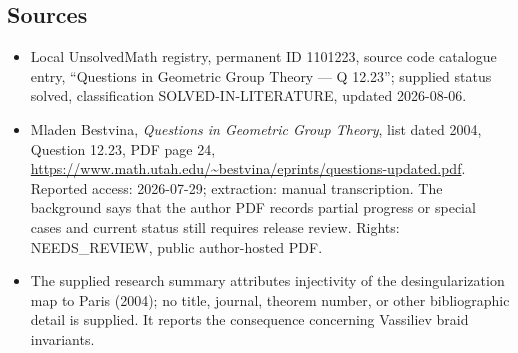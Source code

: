\documentclass[11pt]{article}
\begin{document}
\subsection{Sources}
\begin{itemize}
\item Local UnsolvedMath registry, permanent ID 1101223, source code catalogue entry, ``Questions in Geometric Group Theory --- Q 12.23''; supplied status solved, classification SOLVED-IN-LITERATURE, updated 2026-08-06.
\item Mladen Bestvina, \emph{Questions in Geometric Group Theory}, list dated 2004, Question 12.23, PDF page 24, \url{https://www.math.utah.edu/~bestvina/eprints/questions-updated.pdf}. Reported access: 2026-07-29; extraction: manual transcription. The background says that the author PDF records partial progress or special cases and current status still requires release review. Rights: NEEDS\_REVIEW, public author-hosted PDF.
\item The supplied research summary attributes injectivity of the desingularization map to Paris (2004); no title, journal, theorem number, or other bibliographic detail is supplied. It reports the consequence concerning Vassiliev braid invariants.
\end{itemize}
\end{document}
